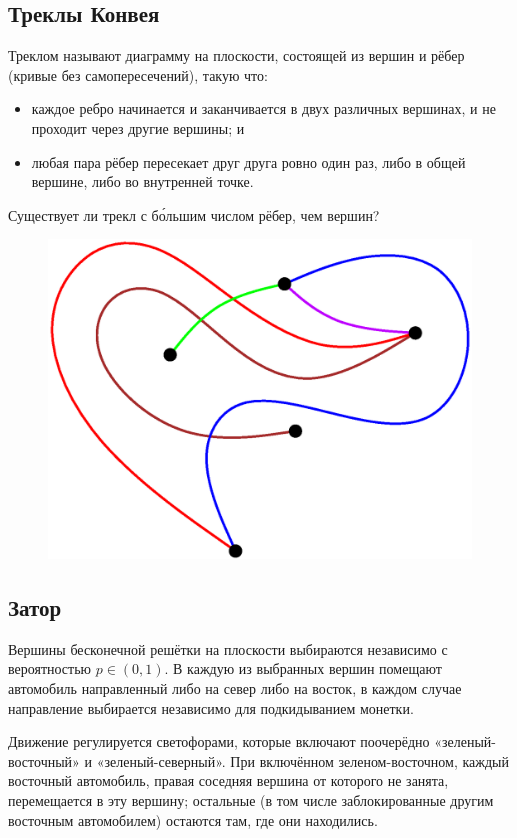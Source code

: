 \subsection*{Треклы Конвея}

Треклом называют диаграмму на плоскости, состоящей из вершин и рёбер (кривые без самопересечений), такую что:
\begin{itemize}
\item каждое ребро начинается и заканчивается в двух различных вершинах, и не проходит через другие вершины; и
\item любая пара рёбер пересекает друг друга ровно один раз, либо в общей вершине, либо во внутренней точке.
\end{itemize}

Существует ли трекл с б\'{о}льшим числом рёбер, чем вершин?

\begin{figure}[h!]
\centering
\includegraphics[scale=0.5]{Figs/UnsolvedPuzzles/thrack}
\end{figure}

\subsection*{Затор}

Вершины бесконечной решётки на плоскости выбираются независимо с вероятностью $p\in (0,1)$.
В каждую из выбранных вершин помещают автомобиль направленный либо на север либо на восток,
в каждом  случае направление выбирается независимо для подкидыванием монетки.

Движение регулируется светофорами, которые включают поочерёдно «зеленый-восточный» и «зеленый-северный».
При включённом зеленом-восточном, каждый восточный автомобиль, правая соседняя вершина от которого не занята, перемещается в эту вершину; остальные (в том числе заблокированные другим восточным автомобилем) остаются там, где они находились.

